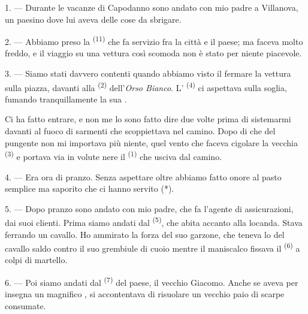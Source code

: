 \VUsaut{4.0mm}
\VUsaut{3.0mm}
\VUfilet{16mm}
\VUsaut{5.6mm}
\VUsaut{3.0mm}

\VUsaut{3.0mm}

\VUsaut{4.0mm}

1. --- Durante le vacanze di Capodanno sono andato con mio padre a Villanova, un
paesino dove lui aveva delle cose da sbrigare.

2. --- Abbiamo preso la  \textsuperscript{(11)} che fa servizio fra
la città e il paese; ma faceva molto freddo, e il viaggio su una vettura così scomoda
non è stato per niente piacevole.

3. --- Siamo stati davvero contenti quando abbiamo visto il 
fermare la vettura sulla piazza, davanti alla  \textsuperscript{(2)}
dell'\textit{Orso Bianco}. L' \textsuperscript{(4)} ci aspettava sulla
soglia, fumando tranquillamente la sua .

Ci ha fatto entrare, e non me lo sono fatto dire due volte prima di sistemarmi davanti
al fuoco di sarmenti che scoppiettava nel camino. Dopo di che del  pungente non mi importava più niente, quel vento che faceva cigolare la vecchia
 \textsuperscript{(3)} e portava via in volute nere il 
\textsuperscript{(1)} che usciva dal camino.

4. --- Era ora di pranzo. Senza aspettare oltre abbiamo fatto onore al pasto semplice
ma saporito che ci hanno servito (*).

\VUsaut{3.0mm}

5. --- Dopo pranzo sono andato con mio padre, che fa l'agente di assicurazioni, dai
suoi clienti. Prima siamo andati dal  \textsuperscript{(5)}, che
abita accanto alla locanda. Stava ferrando un cavallo. Ho ammirato la forza del suo
garzone, che teneva lo  del cavallo saldo contro il suo grembiule di
cuoio mentre il maniscalco fissava il  \textsuperscript{(6)} a colpi di
martello.

6. --- Poi siamo andati dal  \textsuperscript{(7)} del paese, il
vecchio Giacomo. Anche se aveva per insegna un magnifico , si
accontentava di risuolare un vecchio paio di scarpe consumate.

